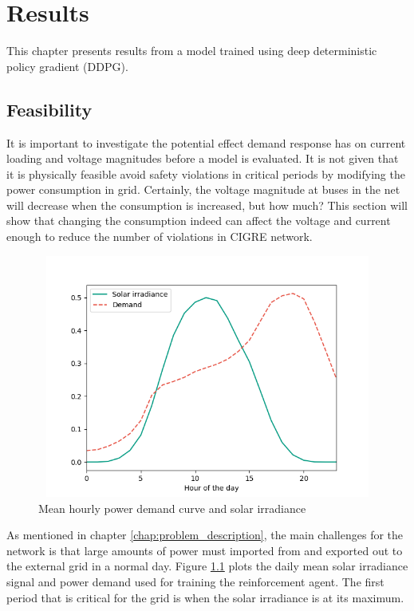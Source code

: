 \documentclass[class=book, crop=false, 11pt]{standalone}
\begin{document}
\chapter{Results}\label{chapter:results}

This chapter presents results from a model trained using deep deterministic policy gradient (DDPG).

\section{Feasibility}
It is important to investigate the potential effect demand response has on current loading and voltage magnitudes before a model is evaluated. It is not given that it is physically feasible avoid safety violations in critical periods by modifying the power consumption in grid. Certainly, the voltage magnitude at buses in the net will decrease when the consumption is increased, but how much? This section will show that changing the consumption indeed can affect the voltage and current enough to reduce the number of violations in CIGRE network.
\begin{figure}[h]
    \center
\includegraphics[height=8cm, width=12cm]{figures/demand_and_solar.png}
    \caption[size = 9]{Mean hourly power demand curve and solar irradiance}
    \label{fig:results:demand_and_solar}
\end{figure}

As mentioned in chapter \ref{chap:problem_description}, the main challenges for the network is that large amounts of power must imported from and exported out to the external grid in a normal day. Figure \ref{fig:results:demand_and_solar} plots the daily mean solar irradiance signal and power demand used for training the reinforcement agent. The first period that is critical for the grid is when the solar irradiance is at its maximum. 
\end{document}
